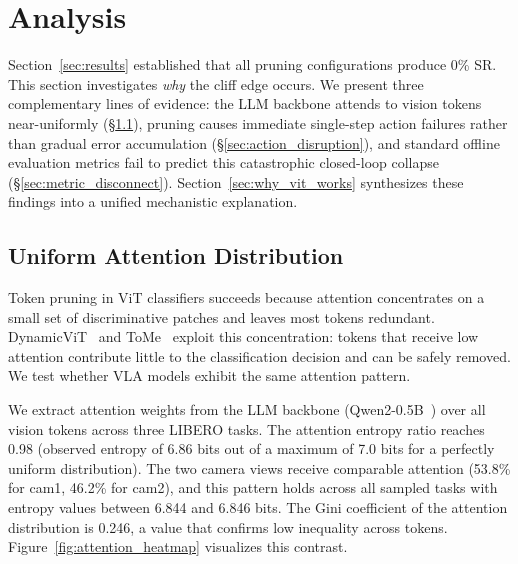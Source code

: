 
\section{Analysis}
\label{sec:analysis}

Section~\ref{sec:results} established that all pruning configurations produce 0\% SR.
This section investigates \emph{why} the cliff edge occurs.
We present three complementary lines of evidence: the LLM backbone attends to vision tokens near-uniformly (\S\ref{sec:uniform_attention}), pruning causes immediate single-step action failures rather than gradual error accumulation (\S\ref{sec:action_disruption}), and standard offline evaluation metrics fail to predict this catastrophic closed-loop collapse (\S\ref{sec:metric_disconnect}).
Section~\ref{sec:why_vit_works} synthesizes these findings into a unified mechanistic explanation.

\subsection{Uniform Attention Distribution}
\label{sec:uniform_attention}

Token pruning in ViT classifiers succeeds because attention concentrates on a small set of discriminative patches and leaves most tokens redundant.
DynamicViT~\cite{rao2021dynamicvit} and ToMe~\cite{bolya2023tome} exploit this concentration: tokens that receive low attention contribute little to the classification decision and can be safely removed.
We test whether VLA models exhibit the same attention pattern.

We extract attention weights from the LLM backbone (Qwen2-0.5B~\cite{yang2024qwen2}) over all vision tokens across three LIBERO tasks.
The attention entropy ratio reaches 0.98 (observed entropy of 6.86 bits out of a maximum of 7.0 bits for a perfectly uniform distribution).
The two camera views receive comparable attention (53.8\% for cam1, 46.2\% for cam2), and this pattern holds across all sampled tasks with entropy values between 6.844 and 6.846 bits.
The Gini coefficient of the attention distribution is 0.246, a value that confirms low inequality across tokens.
Figure~\ref{fig:attention_heatmap} visualizes this contrast.

